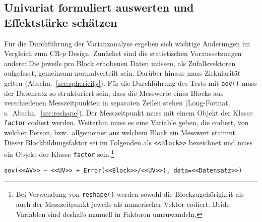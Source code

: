 \subsection{Univariat formuliert auswerten und Effektstärke schätzen}

Für die Durchführung der Varianzanalyse ergeben sich wichtige Änderungen im Vergleich zum CR-$p$ Design. Zunächst sind die statistischen Voraussetzungen andere: Die jeweils pro Block erhobenen Daten müssen, als Zufallsvektoren aufgefasst, gemeinsam normalverteilt sein. Darüber hinaus muss Zirkularität gelten (Abschn.\ \ref{sec:sphericity}). Für die Durchführung des Tests mit \lstinline!aov()! muss der Datensatz so strukturiert sein, dass die Messwerte eines Blocks aus verschiedenen Messzeitpunkten in separaten Zeilen stehen (Long-Format, s.\ Abschn.\ \ref{sec:reshape}). Der Messzeitpunkt muss mit einem Objekt der Klasse \lstinline!factor! codiert werden. Weiterhin muss es eine Variable geben, die codiert, von welcher Person, bzw.\ allgemeiner aus welchem Block ein Messwert stammt. Dieser Blockbildungsfaktor sei im Folgenden als \lstinline!<<Block>>! bezeichnet und muss ein Objekt der Klasse \lstinline!factor! sein.\footnote{Bei Verwendung von \lstinline!reshape()! werden sowohl die Blockzugehörigkeit als auch der Messzeitpunkt jeweils als numerischer Vektor codiert. Beide Variablen sind deshalb manuell in Faktoren umzuwandeln.}
\begin{lstlisting}
aov(<<AV>> ~ <<UV>> + Error(<<Block>>/<<UV>>), data=<<Datensatz>>)
\end{lstlisting}

